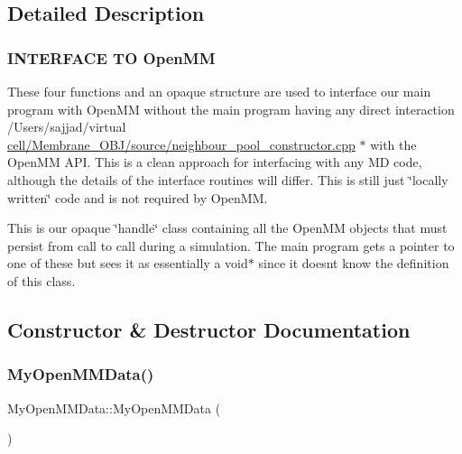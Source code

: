 \subsection{Detailed Description}


 \subsubsection*{I\+N\+T\+E\+R\+F\+A\+CE TO Open\+MM }

These four functions and an opaque structure are used to interface our main program with Open\+MM without the main program having any direct interaction /\+Users/sajjad/virtual \mbox{\hyperlink{neighbour__pool__constructor_8cpp}{cell/\+Membrane\+\_\+\+O\+B\+J/source/neighbour\+\_\+pool\+\_\+constructor.\+cpp}} $\ast$ with the Open\+MM A\+PI. This is a clean approach for interfacing with any MD code, although the details of the interface routines will differ. This is still just \char`\"{}locally written\char`\"{} code and is not required by Open\+MM.

This is our opaque \char`\"{}handle\char`\"{} class containing all the Open\+MM objects that must persist from call to call during a simulation. The main program gets a pointer to one of these but sees it as essentially a void$\ast$ since it doesn\textquotesingle{}t know the definition of this class. 

\subsection{Constructor \& Destructor Documentation}
\mbox{\label{structMyOpenMMData_ad91ea098216e5bbee8f0199d2a7e2c7d}} 
\subsubsection{\texorpdfstring{MyOpenMMData()}{MyOpenMMData()}}
{\footnotesize\ttfamily My\+Open\+M\+M\+Data\+::\+My\+Open\+M\+M\+Data (\begin{DoxyParamCaption}{ }\end{DoxyParamCaption})\hspace{0.3cm}{\ttfamily [inline]}}

\mbox{\label{structMyOpenMMData_a8b18e9a40611765e2c966495e2a339bb}} 
